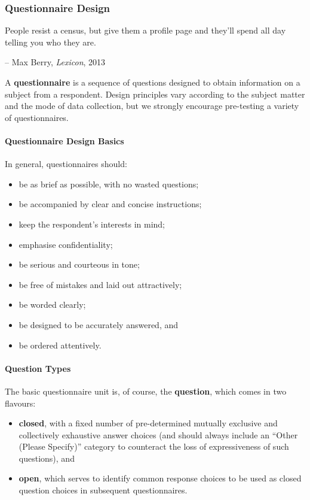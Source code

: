 \subsubsection{Questionnaire Design}
\begin{tcolorbox}[title=A Modern Paradox]
People resist a census, but give them a profile page and they'll spend all day telling you who they are. \\[-0.6cm]
\begin{flushright}
-- Max Berry, \textit{Lexicon}, 2013
\end{flushright}
\end{tcolorbox}
\noindent 
A \textbf{questionnaire} is a sequence of questions designed to obtain information on a subject from a respondent. Design principles vary according to the subject matter and the mode of data collection, but we strongly encourage pre-testing a variety of questionnaires.\paragraph{Questionnaire Design Basics} In general, questionnaires should: 
\begin{itemize}[noitemsep] 
\item be as brief as possible, with no wasted questions;
\item be accompanied by clear and concise instructions;
\item keep the respondent's interests in mind;
\item emphasise confidentiality;
\item be serious and courteous in tone;
\item be free of mistakes and laid out attractively;
\item be worded clearly; 
\item be designed to be accurately answered, and 
\item be ordered attentively. 
\end{itemize}
\paragraph{Question Types} The basic questionnaire unit is, of course, the \textbf{question}, which comes in two flavours: 
\begin{itemize}[noitemsep]
\item \textbf{closed}, with a fixed number of pre-determined mutually exclusive and collectively exhaustive answer choices (and should always include an ``Other (Please Specify)'' category to counteract the loss of expressiveness of such questions), and
\item \textbf{open}, which serves to identify common response choices to be used as closed question choices in subsequent questionnaires. 
\end{itemize}
